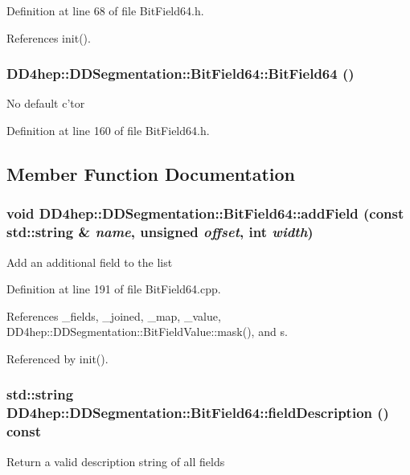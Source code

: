 Definition at line 68 of file BitField64.h.

References init().\hypertarget{class_d_d4hep_1_1_d_d_segmentation_1_1_bit_field64_a16079b52f710e962e5f3630f236383d6}{
\subsubsection[{BitField64}]{\setlength{\rightskip}{0pt plus 5cm}DD4hep::DDSegmentation::BitField64::BitField64 ()}}
\label{class_d_d4hep_1_1_d_d_segmentation_1_1_bit_field64_a16079b52f710e962e5f3630f236383d6}
No default c'tor 

Definition at line 160 of file BitField64.h.

\subsection{Member Function Documentation}
\hypertarget{class_d_d4hep_1_1_d_d_segmentation_1_1_bit_field64_ae34df46a8957a5a6df76d194889a7d06}{
\subsubsection[{addField}]{\setlength{\rightskip}{0pt plus 5cm}void DD4hep::DDSegmentation::BitField64::addField (const std::string \& {\em name}, \/  unsigned {\em offset}, \/  int {\em width})}}
\label{class_d_d4hep_1_1_d_d_segmentation_1_1_bit_field64_ae34df46a8957a5a6df76d194889a7d06}
Add an additional field to the list 

Definition at line 191 of file BitField64.cpp.

References \_\-fields, \_\-joined, \_\-map, \_\-value, DD4hep::DDSegmentation::BitFieldValue::mask(), and s.

Referenced by init().\hypertarget{class_d_d4hep_1_1_d_d_segmentation_1_1_bit_field64_aa2ca281867e8cfccab7111e0c439a8f8}{
\subsubsection[{fieldDescription}]{\setlength{\rightskip}{0pt plus 5cm}std::string DD4hep::DDSegmentation::BitField64::fieldDescription () const}}
\label{class_d_d4hep_1_1_d_d_segmentation_1_1_bit_field64_aa2ca281867e8cfccab7111e0c439a8f8}
Return a valid description string of all fields 

